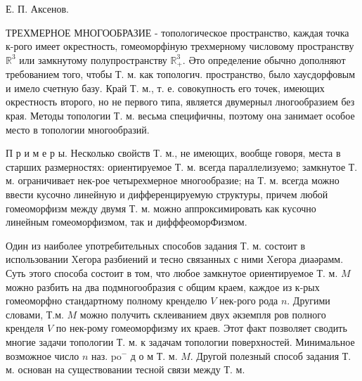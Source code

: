 \documentclass[10pt]{article}
\begin{document}
Е. П. Аксенов.



ТРЕХМЕРНОЕ МНОГООБРАЗИЕ - топологическое пространство, каждая точка к-рого имеет окрестность, гомеоморфіную трехмерному числовому пространству $\mathbb{R}^{3}$ или замкнутому полупространству $\mathbb{R}_{+}^{3}$. Әто определение обычно дополняют требованием того, чтобы Т. м. как топологич. пространство, было хаусдорфовым и имело счетную базу. Край Т. м., т. е. совокупность его точек, имеющих окрестность второго, но не первого типа, является двумерныл лногообразием без края. Методы топологии Т. м. весьма специфичны, поэтому она занимает особое место в топологии многообразий.



П р и м е р ы. Несколько свойств Т. м., не имеющих, вообще говоря, места в старших размерностях: ориентируемое Т. м. всегда параллелизуемо; замкнутое Т. м. ограничивает нек-рое четырехмерное многообразие; на Т. м. всегда можно ввести кусочно линейную и дифференцируемую структуры, причем любой гомеоморфизм между двумя Т. м. можно аппроксимировать как кусочно линейным гомеоморфизмом, так и дифффеоморФизмом.



Один из наиболее употребительных способов задания Т. м. состоит в использовании Xегора разбиений и тесно связанных с ними Xегора диаәрамм. Суть этого способа состоит в том, что любое замкнутое ориентируемое Т. м. $M$ можно разбить на два подмногообразия с общим краем, каждое из к-рых гомеоморфно стандартному полному кренделю $V$ нек-рого рода $n$. Другими словами, Т.м. $M$ можно получить склеиванием двух әкземпля ров полного кренделя $V$ по нек-рому гомеоморфизму их краев. Этот факт позволяет сводить многие задачи топологии Т. м. к задачам топологии поверхностей. Минимальное возможное число $n$ наз. $\mathrm{p} \mathrm{o}^{-}$ д о м Т. м. $M$. Другой полезный способ задания Т. м. основан на существовании тесной связи между Т. м.
\end{document}
